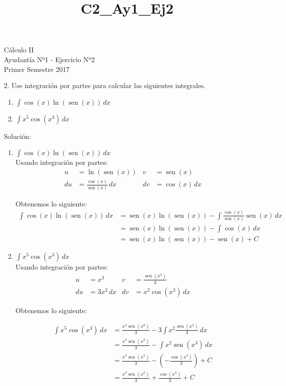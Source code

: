 \documentclass[a4paper,10pt]{article}
\title{C2_Ay1_Ej2}
\newcommand{\dis}{\displaystyle}
\def\sin{\operatorname{sen}}
\begin{document}
\begin{center}
Cálculo II\\
Ayudantía Nº1 - Ejercicio Nº2\\
Primer Semestre 2017
\end{center}





2. Use integraci\'{o}n por partes para calcular las siguientes
integrales.
\begin{enumerate}[label=\emph{\alph*)}]
\item $\dis \int \cos(x) \ln(\sin(x))\, dx$
\item $\dis \int x^5\cos(x^3)\, dx$
\end{enumerate}


\vspace{5mm}

Solución:

\begin{enumerate}[label=\emph{\alph*)}]
\item $\dis \int \cos(x) \ln(\sin(x))\, dx$\\

Usando integración por partes:
\begin{align*}
 u  &=  \ln(\sin(x))  &   v  &= \sin(x) \\
 du &= \frac{\cos(x)}{\sin(x)} \, dx     &   dv &= \cos(x) \, dx
\end{align*}

Obtenemos lo siguiente:
\begin{align*}
 \dis \int \cos(x) \ln(\sin(x))\, dx &= \sin(x) \ln(\sin(x)) - \dis \int \frac{\cos(x)}{\sin(x)}\sin(x) \, dx \\
      &=  \sin(x) \ln(\sin(x)) - \dis \int \cos(x) \, dx \\
       &= \sin(x) \ln(\sin(x)) - \sin(x) +C
\end{align*}

\item $\dis \int x^5\cos(x^3)\, dx$\\
Usando integración por partes:
\begin{align*}
 u  &=  x^3  &   v  &= \frac{\sin(x^3)}{3} \\
 du &= 3x^2 \, dx     &   dv &= x^2\cos(x^3) \, dx
\end{align*}

Obtenemos lo siguiente:

\begin{align*}
 \dis \int x^5\cos(x^3)\, dx &= \frac{x^3\sin(x^3)}{3} - 3 \dis \int x^2 \frac{\sin(x^3)}{3} \, dx \\
      &=  \frac{x^3\sin(x^3)}{3} - \dis \int x^2 \sin(x^3) \, dx \\
       &=  \frac{x^3\sin(x^3)}{3} - (- \frac{\cos(x^3)}{3}) + C \\
       &=  \frac{x^3\sin(x^3)}{3} + \frac{\cos(x^3)}{3} + C
\end{align*}
\end{enumerate}
\end{document}
